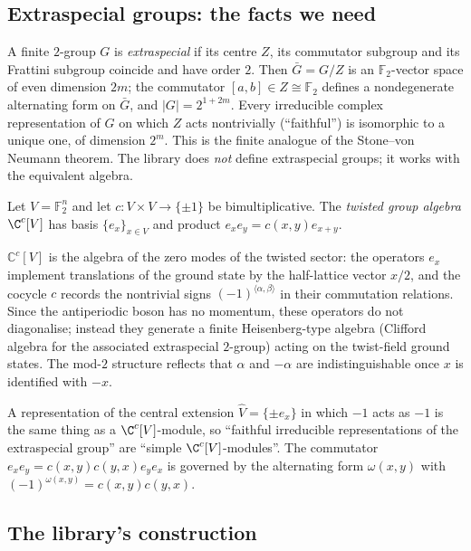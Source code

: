 \subsection{Extraspecial groups: the facts we need}

A finite $2$-group $G$ is \emph{extraspecial} if its centre $Z$, its commutator subgroup and its
Frattini subgroup coincide and have order $2$.  Then $\bar G=G/Z$ is an $\mathbb F_2$-vector space
of even dimension $2m$; the commutator $[a,b]\in Z\cong\mathbb F_2$ defines a nondegenerate
alternating form on $\bar G$, and $|G|=2^{1+2m}$.  Every irreducible complex representation of $G$
on which $Z$ acts nontrivially (``faithful'') is isomorphic to a unique one, of dimension $2^m$.
This is the finite analogue of the Stone--von Neumann theorem.  The library does \emph{not} define
extraspecial groups; it works with the equivalent algebra.

\begin{definition}\label{ch06:def:twga}
Let $V=\mathbb F_2^n$ and let $c:V\times V\to\{\pm1\}$ be bimultiplicative.  The \emph{twisted group
algebra} $\C^c[V]$ has basis $\{e_x\}_{x\in V}$ and product $e_xe_y=c(x,y)e_{x+y}$.
\end{definition}

\begin{physics}
$\mathbb C^c[V]$ is the algebra of the zero modes of the twisted sector: the operators $e_x$ implement translations of the ground state by the half-lattice vector $x/2$, and the cocycle $c$ records the nontrivial signs $(-1)^{\langle\alpha,\beta\rangle}$ in their commutation relations. Since the antiperiodic boson has no momentum, these operators do not diagonalise; instead they generate a finite Heisenberg-type algebra (Clifford algebra for the associated extraspecial $2$-group) acting on the twist-field ground states. The mod-$2$ structure reflects that $\alpha$ and $-\alpha$ are indistinguishable once $x$ is identified with $-x$.
\end{physics}
A representation of the central extension $\hat V=\{\pm e_x\}$ in which $-1$ acts as $-1$ is the
same thing as a $\C^c[V]$-module, so ``faithful irreducible representations of the extraspecial
group'' are ``simple $\C^c[V]$-modules''.  The commutator $e_xe_y=c(x,y)c(y,x)e_ye_x$ is governed by
the alternating form $\omega(x,y)$ with $(-1)^{\omega(x,y)}=c(x,y)c(y,x)$.

\subsection{The library's construction}

